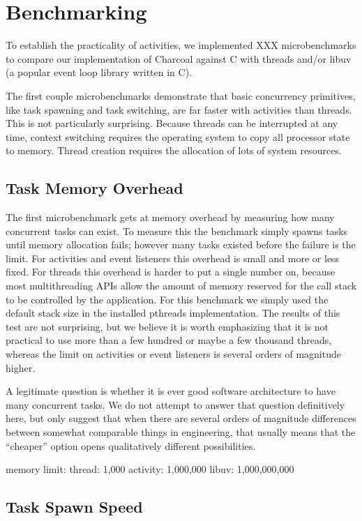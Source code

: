 \documentclass[10pt,preprint]{sigplanconf}
\begin{document}
\section{Benchmarking}

To establish the practicality of activities, we implemented XXX microbenchmarks to compare our implementation of Charcoal against C with threads and/or libuv (a popular event loop library written in C).

The first couple microbenchmarks demonstrate that basic concurrency primitives, like task spawning and task switching, are far faster with activities than threads.
This is not particularly surprising.
Because threads can be interrupted at any time, context switching requires the operating system to copy all processor state to memory.
Thread creation requires the allocation of lots of system resources.

\subsection{Task Memory Overhead}

The first microbenchmark gets at memory overhead by measuring how many concurrent tasks can exist.
To measure this the benchmark simply spawns tasks until memory allocation fails; however many tasks existed before the failure is the limit.
For activities and event listeners this overhead is small and more or less fixed.
For threads this overhead is harder to put a single number on, because most multithreading APIs allow the amount of memory reserved for the call stack to be controlled by the application.
For this benchmark we simply used the default stack size in the installed pthreads implementation.
The results of this test are not surprising, but we believe it is worth emphasizing that it is not practical to use more than a few hundred or maybe a few thousand threads, whereas the limit on activities or event listeners is several orders of magnitude higher.

A legitimate question is whether it is ever good software architecture to have many concurrent tasks.
We do not attempt to answer that question definitively here, but only suggest that when there are several orders of magnitude differences between somewhat comparable things in engineering, that usually means that the ``cheaper'' option opens qualitatively different possibilities.

memory limit: thread: 1,000 activity: 1,000,000 libuv: 1,000,000,000

\subsection{Task Spawn Speed}
\end{document}
